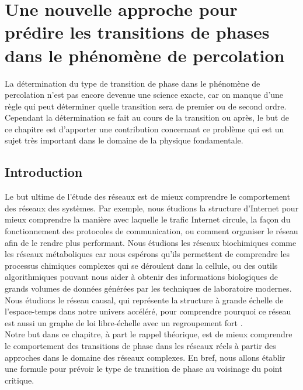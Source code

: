 \newcommand{\kma}{\textless k_a \textgreater}
\newcommand{\kmaa}{\textless k_a^2 \textgreater}
\chapter{Une nouvelle approche pour prédire les transitions de phases dans le phénomène de percolation}

La détermination du type de transition de phase dans le phénomène de percolation n'est pas encore devenue une science exacte, car on manque d'une règle qui  peut déterminer quelle transition sera de premier ou de second ordre. Cependant la détermination se fait au cours de la transition ou après, le but de ce chapitre est d'apporter une contribution concernant ce problème qui est un sujet très important dans le domaine de la physique fondamentale.   


\section{Introduction}
Le but ultime de l'étude des réseaux est de mieux comprendre le comportement des réseaux des systèmes. Par exemple, nous étudions la structure d'Internet pour mieux comprendre la manière avec laquelle le trafic Internet  circule, la façon du fonctionnement des protocoles de communication, ou comment organiser le réseau afin de le rendre plus performant. Nous étudions les réseaux biochimiques comme les réseaux métaboliques car nous espérons qu'ils permettent de    comprendre les processus chimiques complexes qui se déroulent dans la cellule, ou des outils algorithmiques pouvant nous aider à obtenir des informations biologiques de grands volumes de données générées par les techniques de laboratoire modernes\cite{Newman2010}. Nous étudions le réseau causal, qui représente la structure à grande échelle de l'espace-temps dans notre univers accéléré, pour comprendre pourquoi ce réseau est aussi un graphe de loi libre-échelle avec un regroupement fort \cite{Sungryong-Arjun2015}.\\
Notre but dans ce chapitre, à part le rappel théorique, est de mieux comprendre le comportement des transitions de phase dans les réseaux réels à partir
des approches dans le domaine des réseaux complexes. En bref, nous allons établir une formule pour prévoir le type de transition de phase au voisinage du point critique.

